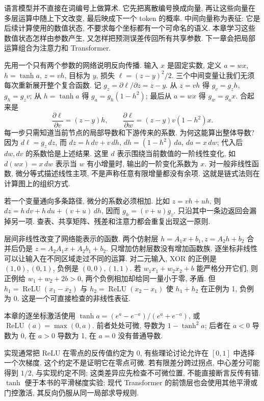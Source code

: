 \label{ch:nn}
语言模型并不直接在词编号上做算术. 它先把离散编号换成向量, 再让这些向量在多层运算中随上下文改变, 最后映成下一个 token 的概率. 中间向量称为表征: 它是后续计算使用的数值状态, 不要求每个坐标都有一个可命名的语义. 本章学习这些数值状态怎样由参数产生, 又怎样把预测误差传回所有共享参数. 下一章会把局部运算组合为注意力和 Transformer.

先用一个只有两个参数的网络说明反向传播. 输入 $x$ 是固定实数, 定义 $a=wx$, $h=\tanh a$, $z=vh$, 目标为 $y$, 损失 $\ell=(z-y)^2/2$. 三个中间变量让我们无须每次重新展开整个复合函数. 记 $g_z=\partial\ell/\partial z=z-y$. 从 $z=vh$ 得 $g_v=g_zh$, $g_h=g_zv$; 从 $h=\tanh a$ 得 $g_a=g_h(1-h^2)$; 最后从 $a=wx$ 得 $g_w=g_ax$. 合起来是
\[
\frac{\partial\ell}{\partial v}=(z-y)h,\qquad
\frac{\partial\ell}{\partial w}=(z-y)v(1-h^2)x.
\]
每一步只需知道当前节点的局部导数和下游传来的系数. 为何这能算出整体导数? 因为 $d\ell=g_z\,dz$, 而 $dz=h\,dv+v\,dh$, $dh=(1-h^2)\,da$, $da=x\,dw$; 代入后 $dw,dv$ 的系数恰是上述结果. 这里 $d$ 表示围绕当前数值的一阶线性变化, 如 $d(wx)=x\,dw$ 表示当 $w$ 有小增量时, 输出的一阶变化系数为 $x$. 对一般非线性函数, 微分等式描述线性主项, 不是声称任意有限增量都没有余项. 这就是链式法则在计算图上的组织方式.

若一个变量通向多条路径, 微分的系数必须相加. 比如 $z=vh+uh$, 则 $dz=h\,dv+h\,du+(v+u)\,dh$, 因而 $g_h=(v+u)g_z$. 只沿其中一条边返回会漏掉另一项. 查表、共享矩阵、残差和注意力都会重复出现这一原则.

层间非线性改变了网络能表示的函数. 两个仿射层 $h=A_1x+b_1,z=A_2h+b_2$ 合并后仍是 $z=A_2A_1x+A_2b_1+b_2$. 只增加仿射层数没有增加函数族. 逐坐标非线性可以让输入在不同区域走过不同的运算. 对二元输入, XOR 的正例是 $(1,0),(0,1)$, 负例是 $(0,0),(1,1)$. 若 $w_1x_1+w_2x_2+b$ 能严格分开它们, 则正例给 $w_1+w_2+2b>0$, 两个负例相加却给同一量小于零, 矛盾. 但
$h_1=\operatorname{ReLU}(x_1-x_2)$ 与 $h_2=\operatorname{ReLU}(x_2-x_1)$ 使 $h_1+h_2$ 在正例为 1, 负例为 0. 这是一个可直接检查的非线性表征.

\begin{definition}
本章的逐坐标激活使用 $\tanh a=(e^a-e^{-a})/(e^a+e^{-a})$, 或 $\operatorname{ReLU}(a)=\max(0,a)$. 前者处处可微, 导数为 $1-\tanh^2a$; 后者在 $a<0$ 导数为 0, 在 $a>0$ 导数为 1, 在 $a=0$ 没有普通导数.
\end{definition}
实现通常把 ReLU 在零点的反传值约定为 0, 有些理论讨论允许在 $[0,1]$ 中选择一个次梯度. 这个约定不是证明它在零点可微. 若有限差分跨过拐点, 中心差分可能得到 $1/2$, 与实现约定不同; 这类差异应先检查不可微位置, 不能直接断言反传有错. $\tanh$ 便于本书的平滑梯度实验; 现代 Transformer 的前馈层也会使用其他平滑或门控激活, 其反向仍服从同一局部求导规则.

